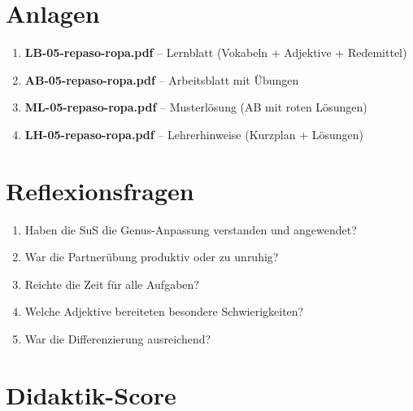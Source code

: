 \documentclass[11pt,a4paper]{article}
\begin{document}
\section{Anlagen}

\begin{enumerate}
    \item \textbf{LB-05-repaso-ropa.pdf} -- Lernblatt (Vokabeln + Adjektive + Redemittel)
    \item \textbf{AB-05-repaso-ropa.pdf} -- Arbeitsblatt mit Übungen
    \item \textbf{ML-05-repaso-ropa.pdf} -- Musterlösung (AB mit roten Lösungen)
    \item \textbf{LH-05-repaso-ropa.pdf} -- Lehrerhinweise (Kurzplan + Lösungen)
\end{enumerate}

\section{Reflexionsfragen}

\begin{enumerate}
    \item Haben die SuS die Genus-Anpassung verstanden und angewendet?
    \item War die Partnerübung produktiv oder zu unruhig?
    \item Reichte die Zeit für alle Aufgaben?
    \item Welche Adjektive bereiteten besondere Schwierigkeiten?
    \item War die Differenzierung ausreichend?
\end{enumerate}

\newpage
\section{Didaktik-Score}
\end{document}
